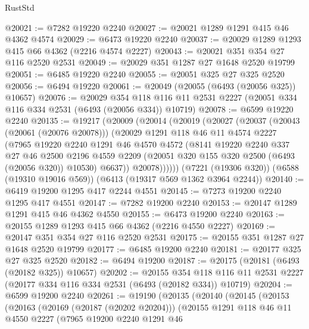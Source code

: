 \begin{lexlean}{RustStd}
\begin{coremodule}
@20021 := @7282 @19220 @2240
@20027 := @20021 @1289 @1291 @415 @46 @4362 @4574
@20029 := @6473 @19220 @2240
@20037 := @20029 @1289 @1293 @415 @66 @4362 (@2216 @4574 @2227)
@20043 := @20021 @351 @354 @27 @116 @2520 @2531
@20049 := @20029 @351 @1287 @27 @1648 @2520 @19799
@20051 := @6485 @19220 @2240
@20055 := @20051 @325 @27 @325 @2520
@20056 := @6494 @19220
@20061 := @20049 (@20055 (@6493 (@20056 @325)) @10657)
@20076 := @20029
    @354
    @118
    @116
    @11
    @2531
    @2227
    (@20051 @334 @116 @334 @2531 (@6493 (@20056 @334)) @10719)
@20078 := @6599 @19220 @2240
@20135 := @19217
    (@20009
      (@20014
        (@20019
          (@20027
            (@20037
              (@20043 (@20061 (@20076 @20078)))
              (@20029
                @1291
                @118
                @46
                @11
                @4574
                @2227
                (@7965
                  @19220
                  @2240
                  @1291
                  @46
                  @4570
                  @4572
                  (@8141
                    @19220
                    @2240
                    @337
                    @27
                    @46
                    @2500
                    @2196
                    @4559
                    @2209
                    (@20051 @320 @155 @320 @2500 (@6493 (@20056 @320)) @10530)
                    @6637))
                @20078))))))
    (@7221 (@19306 @320))
    (@6588 (@19310 @19016 @569))
    (@6413 (@19317 @569 @1362 @3964 @2244))
@20140 := @6419 @19200 @1295 @417 @2244 @4551
@20145 := @7273 @19200 @2240 @1295 @417 @4551
@20147 := @7282 @19200 @2240
@20153 := @20147 @1289 @1291 @415 @46 @4362 @4550
@20155 := @6473 @19200 @2240
@20163 := @20155 @1289 @1293 @415 @66 @4362 (@2216 @4550 @2227)
@20169 := @20147 @351 @354 @27 @116 @2520 @2531
@20175 := @20155 @351 @1287 @27 @1648 @2520 @19799
@20177 := @6485 @19200 @2240
@20181 := @20177 @325 @27 @325 @2520
@20182 := @6494 @19200
@20187 := @20175 (@20181 (@6493 (@20182 @325)) @10657)
@20202 := @20155
    @354
    @118
    @116
    @11
    @2531
    @2227
    (@20177 @334 @116 @334 @2531 (@6493 (@20182 @334)) @10719)
@20204 := @6599 @19200 @2240
@20261 := @19190
    (@20135
      (@20140
        (@20145
          (@20153
            (@20163
              (@20169 (@20187 (@20202 @20204)))
              (@20155
                @1291
                @118
                @46
                @11
                @4550
                @2227
                (@7965
                  @19200
                  @2240
                  @1291
                  @46

\end{coremodule}
\end{lexlean}
